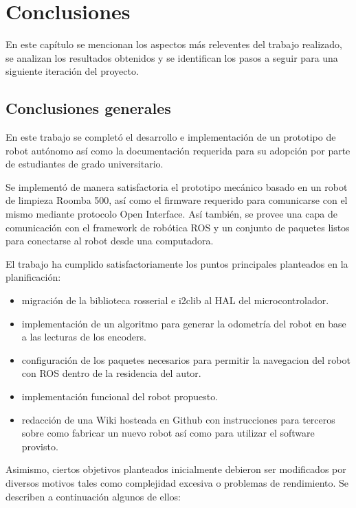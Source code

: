 
\chapter{Conclusiones}

\label{Capitulo5}

En este capítulo se mencionan los aspectos más releventes del trabajo realizado, se analizan los resultados obtenidos y se identifican los pasos a seguir para una siguiente iteración del proyecto.

\section{Conclusiones generales}

En este trabajo se completó el desarrollo e implementación de un prototipo de robot autónomo así como la documentación requerida para su adopción por parte de estudiantes de grado universitario.

Se implementó de manera satisfactoria el prototipo mecánico basado en un robot de limpieza Roomba 500, así como el firmware requerido para comunicarse con el mismo mediante protocolo Open Interface. Así también, se provee una capa de comunicación con el framework de robótica ROS y un conjunto de paquetes listos para conectarse al robot desde una computadora.

El trabajo ha cumplido satisfactoriamente los puntos principales planteados en la planificación:

\begin{itemize}
    \item migración de la biblioteca rosserial e i2clib al HAL del microcontrolador.
    \item implementación de un algoritmo para generar la odometría del robot en base a las lecturas de los encoders.
    \item configuración de los paquetes necesarios para permitir la navegacion del robot con ROS dentro de la residencia del autor.
    \item implementación funcional del robot propuesto.
    \item redacción de una Wiki hosteada en Github con instrucciones para terceros sobre como fabricar un nuevo robot así como para utilizar el software provisto.
\end{itemize}

Asimismo, ciertos objetivos planteados inicialmente debieron ser modificados por diversos motivos tales como complejidad excesiva o problemas de rendimiento. Se describen a continuación algunos de ellos:

